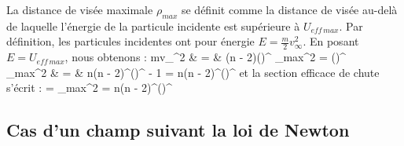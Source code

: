 \eea
La distance de vis\'ee maximale $\rho_{max}$ se d\'efinit comme la distance de vis\'ee au-del\`a de laquelle l'\'energie de la particule incidente est sup\'erieure \`a $U_{eff\, max}$. Par d\'efinition, les particules incidentes ont pour \'energie $E = \frac{m}{2}v_{\infty}^{2}$. En posant $E = U_{eff\, max}$, nous obtenons :
\bea
	mv_{\infty}^{2} & = & (n - 2)\alpha\left(\right)^{} \Leftrightarrow \rho_{max}^{2} = \left(\right)^{} \nonumber \\
	\Leftrightarrow \rho_{max}^{2} & = & n(n - 2)^{}\left(\right)^{ - 1} = n(n - 2)^{}\left(\right)^{} \nonumber
\eea
et la section efficace de chute s'\'ecrit :
\benn
	\sigma = \pi\rho_{max}^{2} = \pi n(n - 2)^{}\left(\right)^{}
\eenn

\subsection{Cas d'un champ suivant la loi de Newton}

